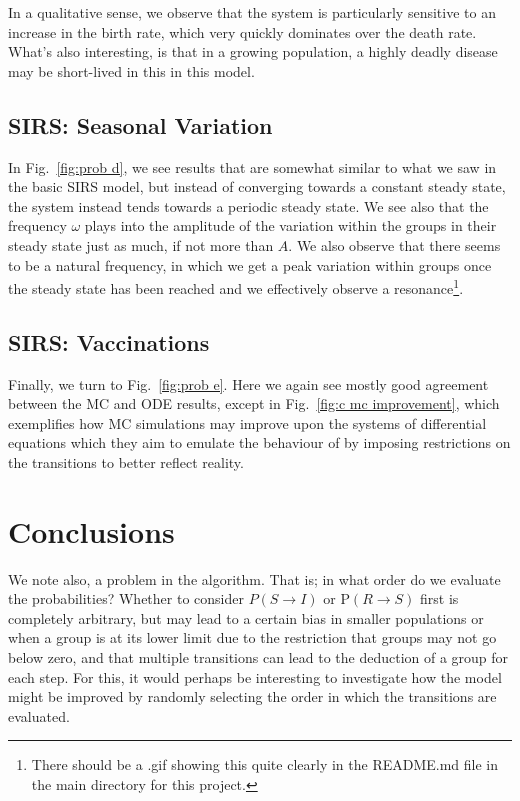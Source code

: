 \documentclass[10pt,showpacs,preprintnumbers,amsmath,amssymb,nofootinbib,aps,prl,twocolumn,groupedaddress,superscriptaddress,showkeys]{revtex4-1}
\begin{document}
    In a qualitative sense, we observe that the system is particularly sensitive to an increase in the birth rate, which very quickly dominates over the death rate. What's also interesting, is that in a growing population, a highly deadly disease may be short-lived in this in this model.

  \subsection{SIRS: Seasonal Variation}
    In Fig.~\ref{fig:prob d}, we see results that are somewhat similar to what we saw in the basic SIRS model, but instead of converging towards a constant steady state, the system instead tends towards a periodic steady state. We see also that the frequency $\omega$ plays into the amplitude of the variation within the groups in their steady state just as much, if not more than $A$. We also observe that there seems to be a natural frequency, in which we get a peak variation within groups once the steady state has been reached and we effectively observe a resonance\footnote{There should be a .gif showing this quite clearly in the README.md file in the main directory for this project.}. 

  \subsection{SIRS: Vaccinations}
    Finally, we turn to Fig.~\ref{fig:prob e}. Here we again see mostly good agreement between the MC and ODE results, except in Fig.~\ref{fig:c mc improvement}, which exemplifies how MC simulations may improve upon the systems of differential equations which they aim to emulate the behaviour of by imposing restrictions on the transitions to better reflect reality. 
    
\section{Conclusions}

  We note also, a problem in the algorithm. That is; in what order do we evaluate the probabilities?
  Whether to consider $P(S\rightarrow I)$ or P$(R\rightarrow S)$ first is completely arbitrary, but may lead to a certain bias in smaller populations or when a group is at its lower limit due to the restriction that groups may not go below zero, and that multiple transitions can lead to the deduction of a group for each step. For this, it would perhaps be interesting to investigate how the model might be improved by randomly selecting the order in which the transitions are evaluated.
\end{document}

